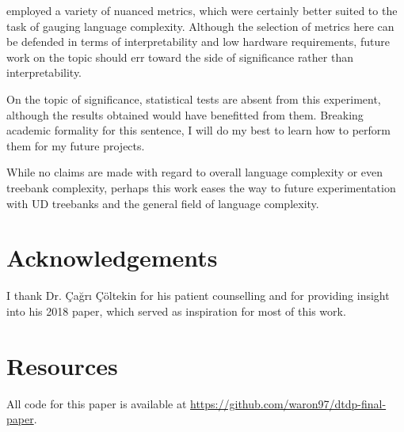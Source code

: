 \documentclass[11pt]{article}
\begin{document}
\citep{berdicevskis-etal-2018-using} employed a variety of nuanced metrics, which were certainly better suited to the task of gauging language complexity. Although the selection of metrics here can be defended in terms of interpretability and low hardware requirements, future work on the topic should err toward the side of significance rather than interpretability.

On the topic of significance, statistical tests are absent from this experiment, although the results obtained would have benefitted from them. Breaking academic formality for this sentence, I will do my best to learn how to perform them for my future projects. 

While no claims are made with regard to overall language complexity or even treebank complexity, perhaps this work eases the way to future experimentation with UD treebanks and the general field of language complexity.

\section*{Acknowledgements}

I thank Dr. Çağrı Çöltekin for his patient counselling and for providing insight into his 2018 paper, which served as inspiration for most of this work.



\appendix

\section*{Resources}

\label{sec:appendix}

All code for this paper is available at \url{https://github.com/waron97/dtdp-final-paper}.
\end{document}
